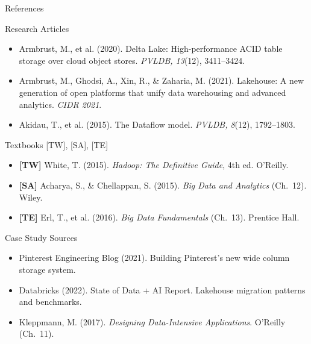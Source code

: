 \documentclass[aspectratio=169,10pt]{beamer}
\begin{document}
\begin{frame}{References}
  \begin{block}{Research Articles}
    \begin{itemize}
      \item Armbrust, M., et al. (2020). Delta Lake: High-performance
            ACID table storage over cloud object stores.
            \textit{PVLDB, 13}(12), 3411--3424.
      \item Armbrust, M., Ghodsi, A., Xin, R., \& Zaharia, M. (2021).
            Lakehouse: A new generation of open platforms that unify
            data warehousing and advanced analytics.
            \textit{CIDR 2021}.
      \item Akidau, T., et al. (2015). The Dataflow model.
            \textit{PVLDB, 8}(12), 1792--1803.
    \end{itemize}
  \end{block}
  \vspace{4pt}
  \begin{block}{Textbooks \textmd{[TW], [SA], [TE]}}
    \begin{itemize}
      \item \textbf{[TW]} White, T. (2015).
            \textit{Hadoop: The Definitive Guide}, 4th ed. O'Reilly.
      \item \textbf{[SA]} Acharya, S., \& Chellappan, S. (2015).
            \textit{Big Data and Analytics} (Ch.~12). Wiley.
      \item \textbf{[TE]} Erl, T., et al. (2016).
            \textit{Big Data Fundamentals} (Ch.~13). Prentice Hall.
    \end{itemize}
  \end{block}
  \vspace{4pt}
  \begin{block}{Case Study Sources}
    \begin{itemize}
      \item Pinterest Engineering Blog (2021). Building Pinterest's
            new wide column storage system.
      \item Databricks (2022). State of Data + AI Report.
            Lakehouse migration patterns and benchmarks.
      \item Kleppmann, M. (2017). \textit{Designing Data-Intensive
            Applications}. O'Reilly (Ch.~11).
    \end{itemize}
  \end{block}
\end{frame}
\end{document}
